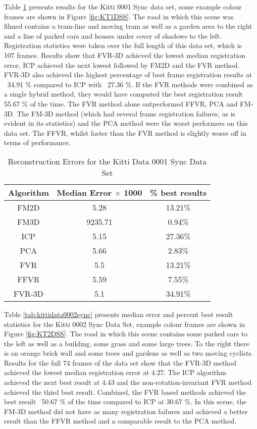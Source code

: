 Table \ref{tab:kittidata0001sync} presents results for the Kitti 0001 Sync data set, some example colour frames are shown in Figure \ref{fig:KT1DSS}. The road in which this scene was filmed contains a tram-line and moving tram as well as a garden area to the right and a line of parked cars and houses under cover of shadows to the left. Registration statistics were taken over the full length of this data set, which is 107 frames. Results show that FVR-3D achieved the lowest median registration error, ICP achieved the next lowest followed by FM2D and the FVR method. FVR-3D also achieved the highest percentage of best frame registration results at ~34.91 \% compared to ICP with ~27.36 \%. If the FVR methods were combined as a single hybrid method, they would have computed the best registration result 55.67 \% of the time. The FVR method alone outperformed FFVR, PCA and FM-3D. The FM-3D method (which had several frame registration failures, as is evident in its statistics) and the PCA method were the worst performers on this data set. The FFVR, whilst faster than the FVR method is slightly worse off in terms of performance. \\ 

\begin{table}[t]
\centering
\caption{Reconstruction Errors for the Kitti Data 0001 Sync Data Set}
\begin{tabular}{ccc}
\hline
\textbf{Algorithm} & \textbf{Median Error $\times$ 1000} & \textbf{\% best results}\\ \hline
FM2D	& 5.28 & 13.21\%\\
FM3D	& 9235.71 & 0.94\%\\
ICP	& 5.15 & 27.36\%\\
PCA	& 5.66 & 2.83\%\\
FVR	& 5.5 & 13.21\%\\
FFVR	& 5.59 & 7.55\%\\
FVR-3D	& 5.1 & 34.91\%\\
\end{tabular}
\label{tab:kittidata0001sync}
\end{table}








Table \ref{tab:kittidata0002sync} presents median error and percent best result statistics for the Kitti 0002 Sync Data Set, example colour frames are shown in Figure \ref{fig:KT2DSS}. The road in which this scene contains some parked cars to the left as well as a building, some grass and some large trees. To the right there is an orange brick wall and some trees and gardens as well as two moving cyclists. Results for the full 74 frames of the data set show that the FVR-3D method achieved the lowest median registration error at 4.27. The ICP algorithm achieved the next best result at 4.43 and the non-rotation-invariant FVR method achieved the third best result. Combined, the FVR based methods achieved the best result ~50.67 \% of the time compared to ICP at 30.67 \%. In this scene, the FM-3D method did not have as many registration failures and achieved a better result than the FFVR method and a comparable result to the PCA method. \\ 

